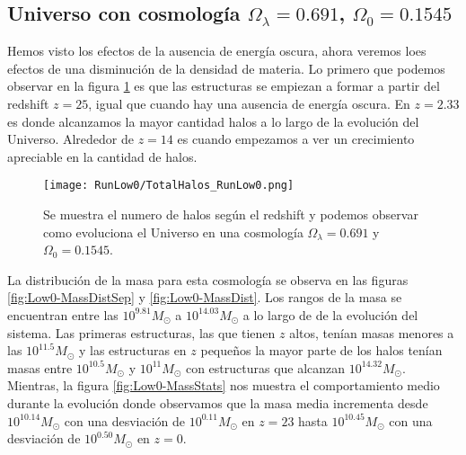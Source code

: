 
\subsection{Universo con cosmología \texorpdfstring{$\Omega_\lambda = 0.691$, $\Omega_0 = 0.1545$ }{Omega lambda = 0, Omega 0 = 0.1545}  }

Hemos visto los efectos de la ausencia de energía oscura, ahora veremos loes efectos de una disminución de la densidad de materia. Lo primero que podemos observar en la figura \ref{fig:Low0_TotalHalos} es que las estructuras se empiezan a formar a partir del redshift $z=25$, igual que cuando  hay una ausencia de energía oscura. En $z= 2.33$ es donde alcanzamos la mayor cantidad halos a lo largo de la evolución del Universo. Alrededor de $z = 14$ es cuando empezamos a ver un crecimiento apreciable en la cantidad de halos.

\begin{figure}[H]
    \centering
    \texttt{[image: RunLow0/TotalHalos\_RunLow0.png]}
    \caption[Evolución del número de halos en un Universo $\Omega_\lambda = 0.691$, $\Omega_0 = 0.1545$]{\footnotesize Se muestra el numero de halos según el redshift y podemos observar como evoluciona el Universo en una cosmología $\Omega_\lambda = 0.691 $ y $\Omega_0 = 0.1545$.}
    \label{fig:Low0_TotalHalos}
\end{figure}

La distribución de la masa para esta cosmología se observa en las figuras \ref{fig:Low0-MassDistSep} y \ref{fig:Low0-MassDist}. Los rangos de la masa se encuentran entre las $10^{9.81}M_\odot$ a $10^{14.03}M_\odot$ a lo largo de de la evolución del sistema. Las primeras estructuras, las que tienen $z$ altos, tenían masas menores a las $10^{11.5}M_\odot$ y las estructuras en $z$ pequeños la mayor parte de los halos tenían masas entre $10^{10.5}M_\odot$ y $10^{11}M_\odot$ con estructuras que alcanzan $10^{14.32}M_\odot$. Mientras, la figura \ref{fig:Low0-MassStats} nos muestra el comportamiento medio durante la evolución donde observamos que la masa media incrementa desde $10^{10.14}M_\odot$ con una desviación de $10^{0.11}M_\odot$ en $z=23$ hasta $10^{10.45}M_\odot$ con una desviación de $10^{0.50}M_\odot$ en $z=0$.

